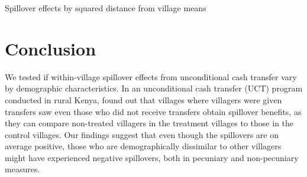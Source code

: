 \documentclass[11pt]{article}
\begin{document}
    \begin{table}[H]
    \centering
    \caption{Spillover effects by squared distance from village means}
    \end{table}

\section{Conclusion}

    We tested if within-village spillover effects from unconditional cash transfer vary by demographic characteristics. In an unconditional cash transfer (UCT) program conducted in rural Kenya, \textcite{haushofer_short-term_2016} found out that villages where villagers were given transfers saw even those who did not receive transfers obtain spillover benefits, as they can compare non-treated villagers in the treatment villages to those in the control villages. Our findings suggest that even though the spillovers are on average positive, those who are demographically dissimilar to other villagers might have experienced negative spillovers, both in pecuniary and non-pecuniary measures.


\newpage

\printbibliography
\end{document}
